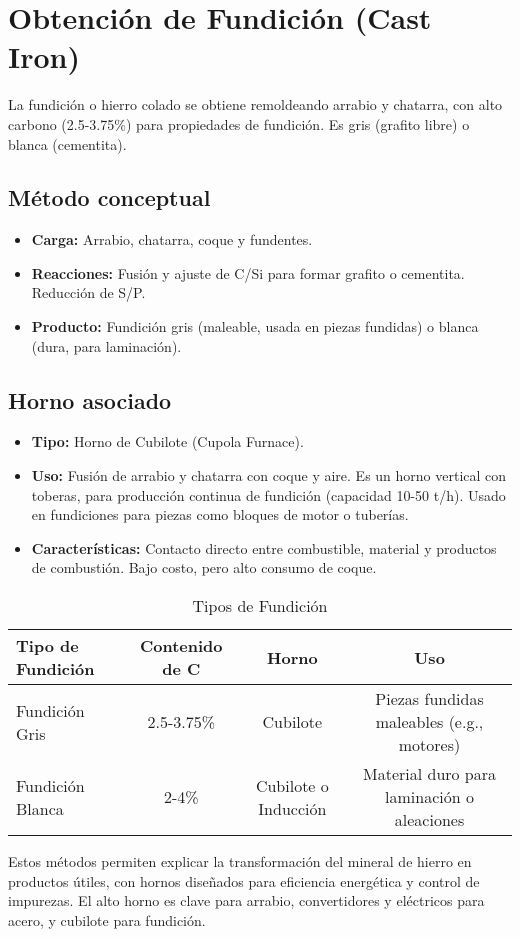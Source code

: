 \documentclass[12pt,a4paper]{article}
\begin{document}
\section{Obtención de Fundición (Cast Iron)}

La fundición o hierro colado se obtiene remoldeando arrabio y chatarra, con alto carbono (2.5-3.75\%) para propiedades de fundición. Es gris (grafito libre) o blanca (cementita).

\subsection{Método conceptual}

\begin{itemize}
    \item \textbf{Carga:} Arrabio, chatarra, coque y fundentes.
    \item \textbf{Reacciones:} Fusión y ajuste de C/Si para formar grafito o cementita. Reducción de S/P.
    \item \textbf{Producto:} Fundición gris (maleable, usada en piezas fundidas) o blanca (dura, para laminación).
\end{itemize}

\subsection{Horno asociado}

\begin{itemize}
    \item \textbf{Tipo:} Horno de Cubilote (Cupola Furnace).
    \item \textbf{Uso:} Fusión de arrabio y chatarra con coque y aire. Es un horno vertical con toberas, para producción continua de fundición (capacidad 10-50 t/h). Usado en fundiciones para piezas como bloques de motor o tuberías.
    \item \textbf{Características:} Contacto directo entre combustible, material y productos de combustión. Bajo costo, pero alto consumo de coque.
\end{itemize}

\begin{table}[h]
    \centering
    \caption{Tipos de Fundición}
    \begin{tabular}{|l|c|c|c|}
        \hline
        Tipo de Fundición & Contenido de C & Horno & Uso \\ \hline
        Fundición Gris & 2.5-3.75\% & Cubilote & Piezas fundidas maleables (e.g., motores) \\
        Fundición Blanca & 2-4\% & Cubilote o Inducción & Material duro para laminación o aleaciones \\ \hline
    \end{tabular}
\end{table}

Estos métodos permiten explicar la transformación del mineral de hierro en productos útiles, con hornos diseñados para eficiencia energética y control de impurezas. El alto horno es clave para arrabio, convertidores y eléctricos para acero, y cubilote para fundición.
\end{document}
